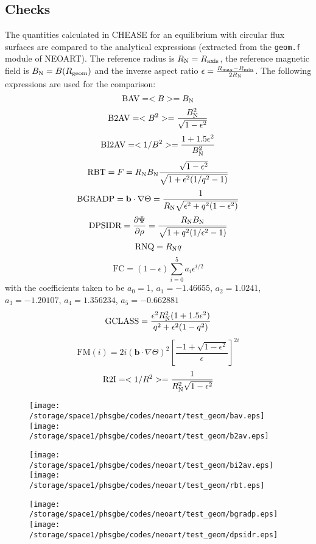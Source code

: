 \documentclass[a4paper,12pt]{article}
\newcommand{\ind}[1]{\ensuremath{_{\rm{#1}}}}
\begin{document}
\subsection{Checks}
The quantities calculated in CHEASE for an equilibrium with circular flux surfaces are compared to the analytical expressions (extracted from the \texttt{geom.f} module of NEOART). The
reference radius is $R\ind{N}=R\ind{axis}$, the reference magnetic field is $B\ind{N}=B(R\ind{geom})$ and the inverse aspect ratio $\epsilon =\frac{R\ind{max}-R\ind{min}}{2R\ind{N}}$. The following
expressions are used for the comparison:
$$\textrm{BAV}=<B>=B\ind{N}$$
$$\textrm{B2AV}=<B^2>=\frac{B\ind{N}^2}{\sqrt{1-\epsilon^2}}$$
$$\textrm{BI2AV}=<1/B^2>=\frac{1+1.5\epsilon^2}{B\ind{N}^2}$$
$$\textrm{RBT}=F=R\ind{N}B\ind{N}\frac{\sqrt{1-\epsilon^2}}{\sqrt{1+\epsilon^2(1/q^2-1)}}$$
$$\textrm{BGRADP}=\mathbf{b}\cdot\nabla \Theta=\frac{1}{R\ind{N}\sqrt{\epsilon^2+q^2(1-\epsilon^2)}}$$
$$\textrm{DPSIDR}=\frac{\partial\Psi}{\partial\rho}=\frac{R\ind{N}B\ind{N}}{\sqrt{1+q^2(1/\epsilon^2-1)}}$$
$$\textrm{RNQ}=R\ind{N}q$$
$$\textrm{FC}=(1-\epsilon)\sum_{i=0}^5 a_i \epsilon^{i/2}$$
with the coefficients taken to be $a_0=1$, $a_1=-1.46655$, $a_2=1.0241$, $a_3=-1.20107$, $a_4=1.356234$, $a_5=-0.662881$
$$\textrm{GCLASS}=\frac{\epsilon^2 R\ind{N}^2(1+1.5\epsilon^2)}{q^2+\epsilon^2(1-q^2)}$$
$$\textrm{FM}(i)=2i(\mathbf{b}\cdot\nabla\Theta)^2\left[\frac{-1+\sqrt{1-\epsilon^2}}{\epsilon}\right]^{2i}$$
$$\textrm{R2I}=<1/R^2>=\frac{1}{R\ind{N}^2\sqrt{1-\epsilon^2}}$$
\begin{figure}[!htb]
        \begin{center}
        \texttt{[image: /storage/space1/phsgbe/codes/neoart/test\_geom/bav.eps]}%
        \texttt{[image: /storage/space1/phsgbe/codes/neoart/test\_geom/b2av.eps]}%
        \end{center}
\end{figure}
\begin{figure}[!htb]
        \begin{center}
        \texttt{[image: /storage/space1/phsgbe/codes/neoart/test\_geom/bi2av.eps]}%
        \texttt{[image: /storage/space1/phsgbe/codes/neoart/test\_geom/rbt.eps]}%
        \end{center}
\end{figure}
\begin{figure}[!htb]
        \begin{center}
        \texttt{[image: /storage/space1/phsgbe/codes/neoart/test\_geom/bgradp.eps]}%
        \texttt{[image: /storage/space1/phsgbe/codes/neoart/test\_geom/dpsidr.eps]}%
        \end{center}
\end{figure}
\end{document}
